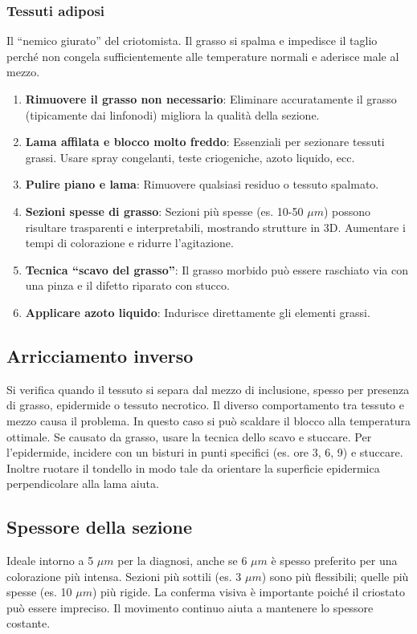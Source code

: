 \subsubsection{Tessuti adiposi} 
Il ``nemico giurato'' del criotomista. Il grasso si spalma e impedisce il taglio perché non congela sufficientemente alle temperature normali e aderisce male al mezzo.
\begin{enumerate}
\item \textbf{Rimuovere il grasso non necessario}: Eliminare accuratamente il grasso (tipicamente dai linfonodi) migliora la qualità della sezione.
\item \textbf{Lama affilata e blocco molto freddo}: Essenziali per sezionare tessuti grassi. Usare spray congelanti, teste criogeniche, azoto liquido, ecc.
\item \textbf{Pulire piano e lama}: Rimuovere qualsiasi residuo o tessuto spalmato.
\item \textbf{Sezioni spesse di grasso}: Sezioni più spesse (es. 10-50 $\mu m$) possono risultare trasparenti e interpretabili, mostrando strutture in 3D. Aumentare i tempi di colorazione e ridurre l'agitazione.
\item \textbf{Tecnica “scavo del grasso”}: Il grasso morbido può essere raschiato via con una pinza e il difetto riparato con stucco.
\item \textbf{Applicare azoto liquido}: Indurisce direttamente gli elementi grassi.
\end{enumerate}


\subsection{Arricciamento inverso}
Si verifica quando il tessuto si separa dal mezzo di inclusione, spesso per presenza di grasso, epidermide o tessuto necrotico. Il diverso comportamento tra tessuto e mezzo causa il problema. In questo caso si può scaldare il blocco alla temperatura ottimale. Se causato da grasso, usare la tecnica dello scavo e stuccare. Per l'epidermide, incidere con un bisturi in punti specifici (es. ore 3, 6, 9) e stuccare. Inoltre ruotare il tondello in modo tale da orientare la superficie epidermica perpendicolare alla lama aiuta.

\subsection{Spessore della sezione}
Ideale intorno a 5 $\mu m$ per la diagnosi, anche se 6 $\mu m$ è spesso preferito per una colorazione più intensa. Sezioni più sottili (es. 3 $\mu m$) sono più flessibili; quelle più spesse (es. 10 $\mu m$) più rigide. La conferma visiva è importante poiché il criostato può essere impreciso. Il movimento continuo aiuta a mantenere lo spessore costante.

